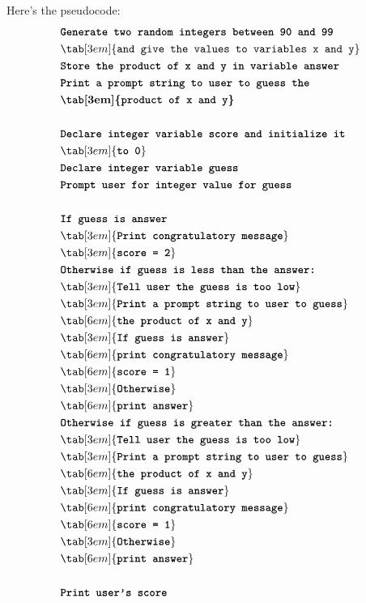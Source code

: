 Here's the pseudocode:
\begin{align*}
& \textbf{\texttt{Generate two random integers between 90 and 99}}\\
& \tab[3em]{\texttt{and give the values to variables x and y}}\\
& \textbf{\texttt{Store the product of x and y in variable answer}}\\
& \textbf{\texttt{Print a prompt string to user to guess the}}\\
& \textbf{\tab[3em]{\texttt{product of x and y}}}\\\\
& \texttt{\textbf{Declare integer variable score and initialize it}}\\
& \tab[3em]{\textbf{\texttt{to 0}}}\\
& \textbf{\texttt{Declare integer variable guess}}\\
& \texttt{\textbf{Prompt user for integer value for guess}}\\\\
& \texttt{\textbf{If guess is answer}}\\
& \tab[3em]{\texttt{\textbf{Print congratulatory message}}}\\
& \tab[3em]{\texttt{\textbf{score = 2}}}\\
& \texttt{\textbf{Otherwise if guess is less than the answer:}}\\
& \tab[3em]{\texttt{\textbf{Tell user the guess is too low}}}\\
& \tab[3em]{\texttt{\textbf{Print a prompt string to user to guess}}}\\
& \tab[6em]{\texttt{\textbf{the product of x and y}}}\\
& \tab[3em]{\texttt{\textbf{If guess is answer}}}\\
& \tab[6em]{\texttt{\textbf{print congratulatory message}}}\\
& \tab[6em]{\texttt{\textbf{score = 1}}}\\
& \tab[3em]{\texttt{\textbf{Otherwise}}}\\
& \tab[6em]{\texttt{\textbf{print answer}}}\\
& \texttt{\textbf{Otherwise if guess is greater than the answer:}}\\
& \tab[3em]{\texttt{\textbf{Tell user the guess is too low}}}\\
& \tab[3em]{\texttt{\textbf{Print a prompt string to user to guess}}}\\
& \tab[6em]{\texttt{\textbf{the product of x and y}}}\\
& \tab[3em]{\texttt{\textbf{If guess is answer}}}\\
& \tab[6em]{\texttt{\textbf{print congratulatory message}}}\\
& \tab[6em]{\texttt{\textbf{score = 1}}}\\
& \tab[3em]{\texttt{\textbf{Otherwise}}}\\
& \tab[6em]{\texttt{\textbf{print answer}}}\\\\
& \texttt{\textbf{Print user's score}}\\
\end{align*}


